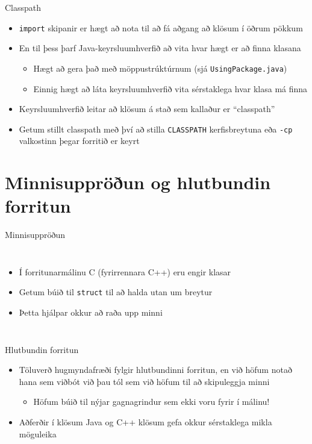 \documentclass[handout]{beamer}
\begin{document}
\begin{frame}[fragile]{Classpath}
	\begin{itemize}
		\item \texttt{import} skipanir er hægt að nota til að fá aðgang að klösum í öðrum pökkum
		\item En til þess þarf Java-keyrsluumhverfið að vita hvar hægt er að finna klasana
		      \begin{itemize}
			      \item Hægt að gera það með möppustrúktúrnum (sjá \texttt{UsingPackage.java})
			      \item Einnig hægt að láta keyrsluumhverfið vita sérstaklega hvar klasa má finna
		      \end{itemize}
		\item Keyrsluumhverfið leitar að klösum á stað sem kallaður er ``classpath''
		\item Getum stillt classpath með því að stilla \texttt{CLASSPATH} kerfisbreytuna eða \texttt{-cp} valkostinn þegar forritið er keyrt
	\end{itemize}
\end{frame}

\section{Minnisuppröðun og hlutbundin forritun}

\begin{frame}[fragile]{Minnisuppröðun}
	\begin{columns}
		\begin{itemize}
			\item Í forritunarmálinu C (fyrirrennara C++) eru engir klasar
			\item Getum búið til \texttt{struct} til að halda utan um breytur
			\item Þetta hjálpar okkur að raða upp minni
		\end{itemize}
	\end{columns}
\end{frame}

\begin{frame}{Hlutbundin forritun}
	\begin{itemize}
		\item Töluverð hugmyndafræði fylgir hlutbundinni forritun, en við höfum notað hana sem viðbót við þau tól sem við höfum til að skipuleggja minni
		      \begin{itemize}
			      \item Höfum búið til nýjar gagnagrindur sem ekki voru fyrir í málinu!
		      \end{itemize}
		\item Aðferðir  í klösum Java og C++ klösum gefa okkur sérstaklega mikla möguleika
	\end{itemize}
\end{frame}
\end{document}
